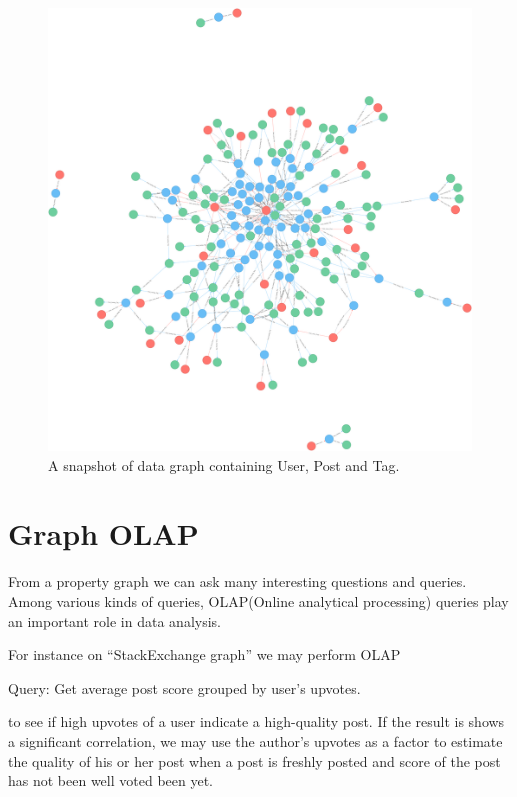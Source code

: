 \begin {figure}[H]
\centering
\includegraphics[scale=0.1]{pic/3.png}
\caption{A snapshot of data graph containing User, Post and Tag.}
\end{figure}

\section{Graph OLAP}


From a property graph we can ask many interesting questions and queries. Among various kinds of queries, OLAP(Online analytical processing) queries play an important role in data analysis. 
 
For instance on ``StackExchange graph'' we may perform OLAP

Query: 		Get average post score grouped by user’s upvotes. 

to see if high upvotes of a user indicate a high-quality post. If the result is shows a significant correlation, we may use the author’s upvotes as a factor to estimate the quality of his or her post when a post is freshly posted and score of the post has not been well voted been yet.


